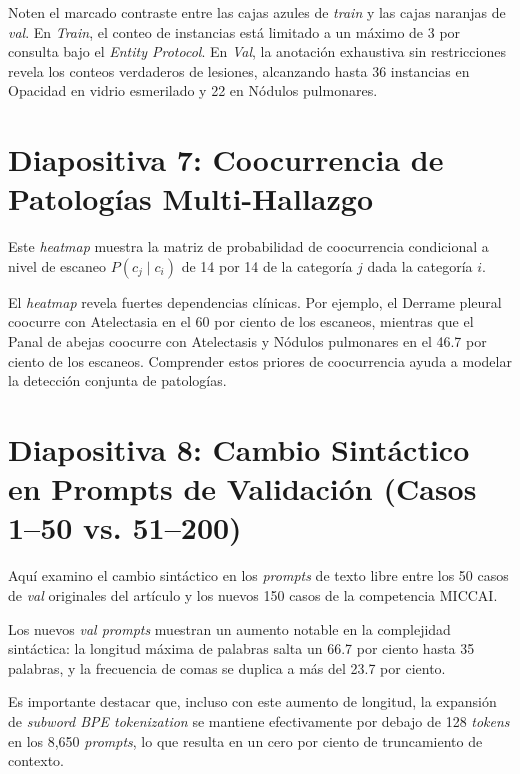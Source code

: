 \documentclass[11pt, a4paper]{article}
\begin{document}
Noten el marcado contraste entre las cajas azules de \textit{train} y las cajas naranjas de \textit{val}. En \textit{Train}, el conteo de instancias está limitado a un máximo de 3 por consulta bajo el \textit{Entity Protocol}. En \textit{Val}, la anotación exhaustiva sin restricciones revela los conteos verdaderos de lesiones, alcanzando hasta 36 instancias en Opacidad en vidrio esmerilado y 22 en Nódulos pulmonares.

\bigskip

\section{Diapositiva 7: Coocurrencia de Patologías Multi-Hallazgo}

Este \textit{heatmap} muestra la matriz de probabilidad de coocurrencia condicional a nivel de escaneo $P(c_j \mid c_i)$ de 14 por 14 de la categoría $j$ dada la categoría $i$.

El \textit{heatmap} revela fuertes dependencias clínicas. Por ejemplo, el Derrame pleural coocurre con Atelectasia en el 60 por ciento de los escaneos, mientras que el Panal de abejas coocurre con Atelectasis y Nódulos pulmonares en el 46.7 por ciento de los escaneos. Comprender estos priores de coocurrencia ayuda a modelar la detección conjunta de patologías.

\bigskip

\section{Diapositiva 8: Cambio Sintáctico en Prompts de Validación (Casos 1--50 vs. 51--200)}

Aquí examino el cambio sintáctico en los \textit{prompts} de texto libre entre los 50 casos de \textit{val} originales del artículo y los nuevos 150 casos de la competencia MICCAI.

Los nuevos \textit{val prompts} muestran un aumento notable en la complejidad sintáctica: la longitud máxima de palabras salta un 66.7 por ciento hasta 35 palabras, y la frecuencia de comas se duplica a más del 23.7 por ciento.

Es importante destacar que, incluso con este aumento de longitud, la expansión de \textit{subword BPE tokenization} se mantiene efectivamente por debajo de 128 \textit{tokens} en los 8,650 \textit{prompts}, lo que resulta en un cero por ciento de truncamiento de contexto.
\end{document}
